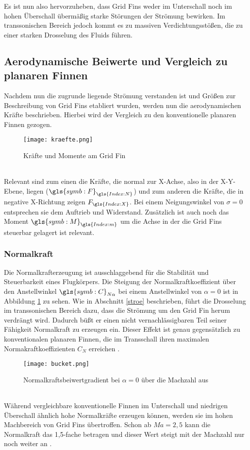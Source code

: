 Es ist nun also hervorzuheben, dass Grid Fins weder im Unterschall noch im hohen Überschall übermäßig starke Störungen der Strömung bewirken. Im transsonischen Bereich jedoch kommt es zu massiven Verdichtungsstößen, die zu einer starken Drosselung des Fluids führen.


\subsection{Aerodynamische Beiwerte und Vergleich zu planaren Finnen}
Nachdem nun die zugrunde liegende Strömung verstanden ist und Größen zur Beschreibung von Grid Fins etabliert wurden, werden nun die aerodynamischen Kräfte beschrieben. Hierbei wird der Vergleich zu den konventionelle planaren Finnen gezogen.
\begin{figure}[h]
	\centering
	\texttt{[image: kraefte.png]}
	\caption{Kräfte und Momente am Grid Fin}
\end{figure}\\
Relevant sind zum einen die Kräfte, die normal zur X-Achse, also in der X-Y-Ebene, liegen ($\gls{symb:F}_{\gls{Index:N}}$) und zum anderen die Kräfte, die in negative X-Richtung zeigen $F_{\gls{Index:X}}$. Bei einem Neigungswinkel von $\sigma = 0$ entsprechen sie dem Auftrieb und Widerstand. Zusätzlich ist auch noch das Moment $\gls{symb:M}_{\gls{Index:m}}$ um die Achse in der die Grid Fins steuerbar gelagert ist relevant.
\subsubsection{Normalkraft}
Die Normalkrafterzeugung ist ausschlaggebend für die Stabilität und Steuerbarkeit eines Flugkörpers. Die Steigung der Normalkraftkoeffizient über den Anstellwinkel $\gls{symb:C}_{N\alpha}$ bei einem Anstellwinkel von $\alpha = 0$ ist in Abbildung \ref{abb_bucket} zu sehen. Wie in Abschnitt \ref{stroe} beschrieben, führt die Drosselung im transsonischen Bereich dazu, dass die Strömung um den Grid Fin herum verdrängt wird. Dadurch büßt er einen nicht vernachlässigbaren Teil seiner Fähigkeit Normalkraft zu erzeugen ein. Dieser Effekt ist genau gegensätzlich zu konventionalen planaren Finnen, die im Transschall ihren maximalen Normakraftkoeffizienten $C_N$ erreichen \cite{synopsis}.
\begin{figure}[h]
	\centering
	\texttt{[image: bucket.png]}
	\caption{Normalkraftsbeiwertgradient bei $\alpha = 0$ über die Machzahl aus \cite{synopsis}}
	\label{abb_bucket}
\end{figure}\\
Während vergleichbare konventionelle Finnen im Unterschall und niedrigen Überschall ähnlich hohe Normalkräfte erzeugen können, werden sie im hohen Machbereich von Grid Fins übertroffen. Schon ab $Ma=2,5$ kann die Normalkraft das 1,5-fache betragen und dieser Wert steigt mit der Machzahl nur noch weiter an \cite{synopsis,vergleichPlanarNATO}.

